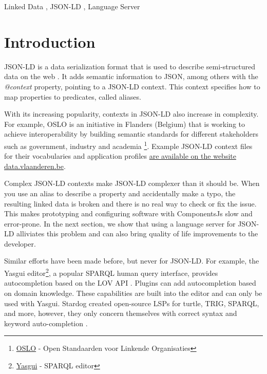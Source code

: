 \documentclass[
]{ceurart}
\begin{document}
\begin{keywords}
  Linked Data \sep 
  JSON-LD \sep
  Language Server
\end{keywords}

\maketitle

\section{Introduction}

JSON-LD is a data serialization format that is used to describe semi-structured data on the web \cite{JSON-LD-W3C}.
It adds semantic information to JSON, among others with the \textit{@context} property, pointing to a JSON-LD context.
This context specifies how to map properties to predicates, called aliases.

With its increasing popularity, contexts in JSON-LD also increase in complexity.
For example, OSLO is an initiative in Flanders (Belgium) that is working to achieve interoperability by building semantic standards for different stakeholders such as government, industry and academia \footnote{\href{https://www.vlaanderen.be/digitaal-vlaanderen/onze-oplossingen/oslo}{OSLO} - Open Standaarden voor Linkende Organisaties}.
Example JSON-LD context files for their vocabularies and application profiles \href{https://data.vlaanderen.be}{are available on the website data.vlaanderen.be}.

Complex JSON-LD contexts make JSON-LD complexer than it should be. 
When you use an alias to describe a property and accidentally make a typo, the resulting linked data is broken and there is no real way to check or fix the issue.
This makes prototyping and configuring software with ComponentsJs slow and error-prone.
In the next section, we show that using a language server for JSON-LD alliviates this problem and can also bring quality of life improvements to the developer.

Similar efforts have been made before, but never for JSON-LD. For example, the Yasgui editor\footnote{\href{https://triply.cc/docs/yasgui/}{Yasgui} - SPARQL editor}, a popular SPARQL human query interface, provides autocompletion based on the LOV API \cite{LOV}. Plugins can add autocompletion based on domain knowledge. These capabilities are built into the editor and can only be used with Yasgui.
Stardog created open-source LSPs for turtle, TRIG, SPARQL, and more, however, they only concern themselves with correct syntax and keyword auto-completion \cite{stardog}. 
\end{document}
